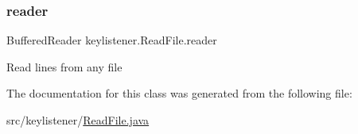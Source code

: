 \subsubsection{\texorpdfstring{reader}{reader}}
{\footnotesize\ttfamily Buffered\+Reader keylistener.\+Read\+File.\+reader\hspace{0.3cm}{\ttfamily [private]}}

Read lines from any file 

The documentation for this class was generated from the following file\+:\begin{DoxyCompactItemize}
\item 
src/keylistener/\hyperlink{_read_file_8java}{Read\+File.\+java}\end{DoxyCompactItemize}
